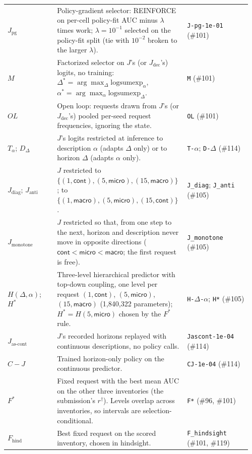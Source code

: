 \begin{longtable}{@{}>{\raggedright\arraybackslash}p{0.2\linewidth}>{\raggedright\arraybackslash}p{0.5\linewidth}>{\raggedright\arraybackslash}p{0.26\linewidth}@{}}
$J_{\mathrm{pg}}$ & Policy-gradient selector: REINFORCE on per-cell policy-fit AUC minus $\lambda$ times work; $\lambda=10^{-1}$ selected on the policy-fit split (tie with $10^{-2}$ broken to the larger $\lambda$). & \texttt{J-pg-1e-01} (\#101) \\
$M$ & Factorized selector on $J$'s (or $J_{\mathrm{dec}}$'s) logits, no training: $\Delta^*=\arg\max_\Delta\mathrm{logsumexp}_\alpha$, $\alpha^*=\arg\max_\alpha\mathrm{logsumexp}_\Delta$. & \texttt{M} (\#101) \\
$OL$ & Open loop: requests drawn from $J$'s (or $J_{\mathrm{dec}}$'s) pooled per-seed request frequencies, ignoring the state. & \texttt{OL} (\#101) \\
$T_\alpha$; $D_\Delta$ & $J$'s logits restricted at inference to description $\alpha$ (adapts $\Delta$ only) or to horizon $\Delta$ (adapts $\alpha$ only). & \texttt{T-}$\alpha$; \texttt{D-}$\Delta$ (\#114) \\
$J_{\mathrm{diag}}$; $J_{\mathrm{anti}}$ & $J$ restricted to $\{(1,\textsf{cont}),(5,\textsf{micro}),(15,\textsf{macro})\}$; to $\{(1,\textsf{macro}),(5,\textsf{micro}),(15,\textsf{cont})\}$. & \texttt{J\_diag}; \texttt{J\_anti} (\#105) \\
$J_{\mathrm{monotone}}$ & $J$ restricted so that, from one step to the next, horizon and description never move in opposite directions ($\textsf{cont}<\textsf{micro}<\textsf{macro}$; the first request is free). & \texttt{J\_monotone} (\#105) \\
$H(\Delta,\alpha)$; $H^*$ & Three-level hierarchical predictor with top-down coupling, one level per request $(1,\textsf{cont})$, $(5,\textsf{micro})$, $(15,\textsf{macro})$ (1,840,322 parameters); $H^*=H(5,\textsf{micro})$ chosen by the $F^*$ rule. & \texttt{H-}$\Delta$\texttt{-}$\alpha$; \texttt{H*} (\#105) \\
$J_{\text{as-cont}}$ & $J$'s recorded horizons replayed with continuous descriptions, no policy calls. & \texttt{Jascont-1e-04} (\#114) \\
$C\!-\!J$ & Trained horizon-only policy on the continuous predictor. & \texttt{CJ-1e-04} (\#114) \\
$F^*$ & Fixed request with the best mean AUC on the other three inventories (the submission's $r^\dagger$). Levels overlap across inventories, so intervals are selection-conditional. & \texttt{F*} (\#96, \#101) \\
$F_{\mathrm{hind}}$ & Best fixed request on the scored inventory, chosen in hindsight. & \texttt{F\_hindsight} (\#101, \#119) \\

\end{longtable}
